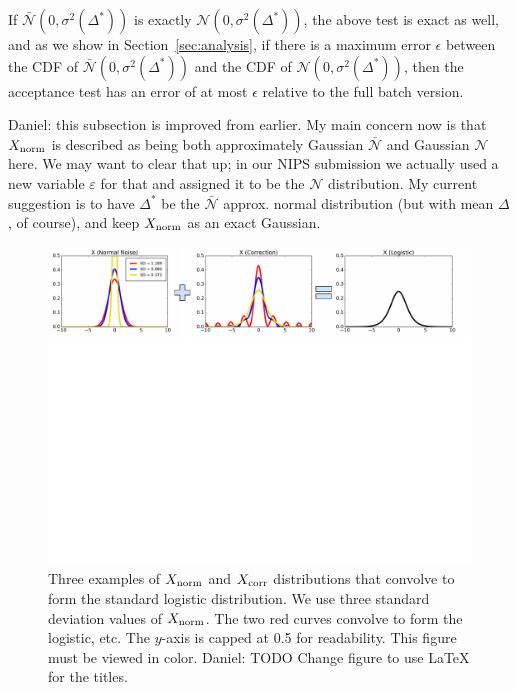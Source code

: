 \documentclass{article}
\begin{document}
If $\mathcal{\bar{N}}(0, \sigma^2(\Delta^*))$ is exactly $\mathcal{N}(0,
\sigma^2(\Delta^*))$, the above test is exact as well, and as we show in
Section~\ref{sec:analysis}, if there is a maximum error $\epsilon$ between the
CDF of $\mathcal{\bar{N}}(0, \sigma^2(\Delta^*))$ and the CDF of $\mathcal{N}(0,
\sigma^2(\Delta^*))$, then the acceptance test has an error of at most
$\epsilon$ relative to the full batch version.

{\color{blue} Daniel: this subsection is improved from earlier. My main concern
now is that $X_{\rm norm}$ is described as being both approximately Gaussian
$\bar{\mathcal{N}}$ and Gaussian $\mathcal{N}$ here. We may want to clear that
up; in our NIPS submission we actually used a new variable $\varepsilon$ for
that and assigned it to be the $\mathcal{N}$ distribution. My current
suggestion is to have $\Delta^*$ be the $\bar{\mathcal{N}}$ approx. normal
distribution (but with mean $\Delta$, of course), and keep $X_{\rm norm}$ as an
exact Gaussian.}

\begin{figure}[t]
    \centering
    \includegraphics[width=1\textwidth]{mh_convolution_diagram_v2}
    \caption{
    Three examples of $X_{\rm norm}$ and $X_{\rm corr}$ distributions that
    convolve to form the standard logistic distribution. We use three standard
    deviation values of $X_{\rm norm}$. The two red curves convolve to form the
    logistic, etc. The $y$-axis is capped at 0.5 for readability. This figure
    must be viewed in color. {\color{blue} Daniel: TODO Change figure to use
    LaTeX for the titles.}
    }
    \label{fig:deconvolution}
\end{figure}
\end{document}
